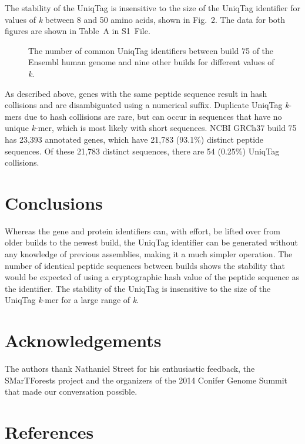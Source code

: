 \documentclass[10pt]{article}
\begin{document}
The stability of the UniqTag is insensitive to the size of the UniqTag
identifier for values of \emph{k} between 8 and 50 amino acids, shown in
Fig.~2. The data for both figures are shown in Table~A in S1~File.

\begin{figure}[htbp]
\centering
\caption{The number of common UniqTag identifiers between build 75 of
the Ensembl human genome and nine other builds for different values of
\emph{k}.}
\end{figure}

As described above, genes with the same peptide sequence result in hash
collisions and are disambiguated using a numerical suffix. Duplicate
UniqTag \emph{k}-mers due to hash collisions are rare, but can occur in
sequences that have no unique \emph{k}-mer, which is most likely with
short sequences. NCBI GRCh37 build 75 has 23,393 annotated genes, which
have 21,783 (93.1\%) distinct peptide sequences. Of these 21,783
distinct sequences, there are 54 (0.25\%) UniqTag collisions.

\section{Conclusions}\label{conclusions}

Whereas the gene and protein identifiers can, with effort, be lifted
over from older builds to the newest build, the UniqTag identifier can
be generated without any knowledge of previous assemblies, making it a
much simpler operation. The number of identical peptide sequences
between builds shows the stability that would be expected of using a
cryptographic hash value of the peptide sequence as the identifier. The
stability of the UniqTag is insensitive to the size of the UniqTag
\emph{k}-mer for a large range of \emph{k}.

\section{Acknowledgements}\label{acknowledgements}

The authors thank Nathaniel Street for his enthusiastic feedback, the
SMarTForests project and the organizers of the 2014 Conifer Genome
Summit that made our conversation possible.

\section{References}\label{references}
\end{document}
